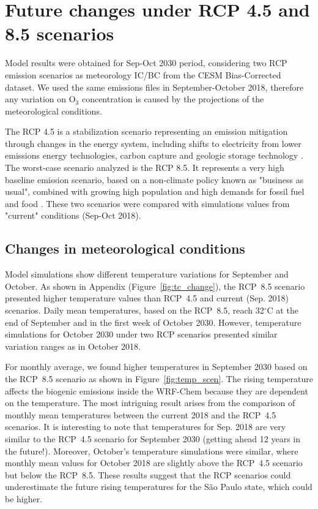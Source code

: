 \section{Future changes under RCP 4.5 and 8.5 scenarios} \label{sec:res_fut}
Model results were obtained for Sep-Oct 2030 period, considering two RCP emission scenarios as meteorology IC/BC from the CESM Bias-Corrected dataset. We used the same emissions files in September-October 2018, therefore any variation on O$_3$ concentration is caused by the projections of the meteorological conditions.

The RCP 4.5 is a stabilization scenario representing an emission mitigation through changes in the energy system, including shifts to electricity from lower emissions energy technologies, carbon capture and geologic storage technology \citep{Thomson2011}.
The worst-case scenario analyzed is the RCP 8.5.
It represents a very high baseline emission scenario, based on a non-climate policy known as "business as usual", combined with growing high population and high demands for fossil fuel and food \citep{Riahi2011}.
These two scenarios were compared with simulations values from "current" conditions (Sep-Oct 2018).

\subsection{Changes in meteorological conditions}\label{subsec:res_chan_met}
Model simulations show different temperature variations for September and October.
As shown in Appendix (Figure~\ref{fig:tc_change}), the RCP~8.5 scenario presented higher temperature values than RCP~4.5 and current (Sep. 2018) scenarios.
Daily mean temperatures, based on the RCP~8.5, reach 32$^\circ$C at the end of September and in the first week of October 2030.
However, temperature simulations for October 2030 under two RCP scenarios presented similar variation ranges as in October 2018.

For monthly average, we found higher temperatures in September 2030 based on the RCP~8.5 scenario as shown in Figure~\ref{fig:temp_scen}.
The rising temperature affects the biogenic emissions inside the WRF-Chem because they are dependent on the temperature.
The most intriguing result arises from the comparison of monthly mean temperatures between the current 2018 and the RCP~4.5 scenarios.
It is interesting to note that temperatures for Sep. 2018 are very similar to the RCP~4.5 scenario for September 2030 (getting ahead 12 years in the future!).
Moreover, October's temperature simulations were similar, where monthly mean values for October 2018 are slightly above the RCP~4.5 scenario but below the RCP~8.5.
These results suggest that the RCP scenarios could underestimate the future rising temperatures for the S\~{a}o Paulo state, which could be higher.

